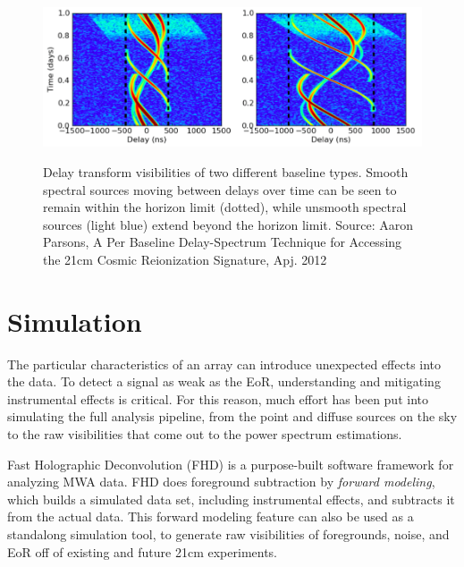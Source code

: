 \documentclass[a0,landscape]{a0poster}
\begin{document}
\begin{multicols}{4}
\begin{figure}[H]
\centering
\includegraphics[width=0.8\linewidth]{figures/delaytransform.png}\\
\caption{Delay transform visibilities of two different baseline types. Smooth spectral sources moving between delays over time can be seen to remain within the horizon limit (dotted), while unsmooth spectral sources (light blue) extend beyond the horizon limit.  Source: Aaron Parsons, A Per Baseline Delay-Spectrum Technique for Accessing the 21cm Cosmic Reionization Signature, Apj. 2012}
\label{fig:delayspace}
\end{figure}





\section*{Simulation}

The particular characteristics of an array can introduce unexpected effects into the data. To detect a signal as weak as the EoR, understanding and mitigating instrumental effects is critical. For this reason, much effort has been put into simulating the full analysis pipeline, from the point and diffuse sources on the sky to the raw visibilities that come out to the power spectrum estimations.

Fast Holographic Deconvolution (FHD) is a purpose-built software framework for analyzing MWA data. FHD does foreground subtraction by \emph{forward modeling}, which builds a simulated data set, including instrumental effects, and subtracts it from the actual data. This forward modeling feature can also be used as a standalong simulation tool, to generate raw visibilities of foregrounds, noise, and EoR off of existing and future 21cm experiments.


\end{multicols}
\end{document}
